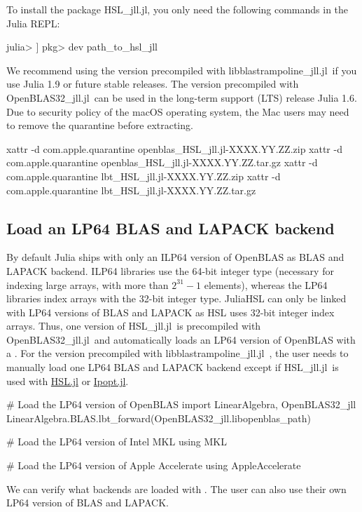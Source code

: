 \documentclass[gdweb]{geradwp}
\newcommand{\HSLjll}{HSL\_jll.jl}
\newcommand{\LBTjll}{libblastrampoline\_jll.jl}
\newcommand{\OpenBLASjll}{OpenBLAS32\_jll.jl}
\begin{document}
To install the package \HSLjll, you only need the following commands in the Julia REPL:
\begin{jllisting}
julia> ]
pkg> dev path_to_hsl_jll
\end{jllisting}
We recommend using the version precompiled with \LBTjll~if you use Julia 1.9 or future stable releases.
The version precompiled with \OpenBLASjll~can be used in the long-term support (LTS) release Julia 1.6.
Due to security policy of the macOS operating system, the Mac users may need to remove the quarantine before extracting.
\begin{jllisting}
xattr -d com.apple.quarantine openblas_HSL_jll.jl-XXXX.YY.ZZ.zip
xattr -d com.apple.quarantine openblas_HSL_jll.jl-XXXX.YY.ZZ.tar.gz
xattr -d com.apple.quarantine lbt_HSL_jll.jl-XXXX.YY.ZZ.zip
xattr -d com.apple.quarantine lbt_HSL_jll.jl-XXXX.YY.ZZ.tar.gz
\end{jllisting}

\subsection{Load an LP64 BLAS and LAPACK backend}

By default Julia ships with only an ILP64 version of OpenBLAS as BLAS and LAPACK backend.
ILP64 libraries use the 64-bit integer type (necessary for indexing large arrays, with more than $2^{31}-1$ elements), whereas the LP64 libraries index arrays with the 32-bit integer type.
JuliaHSL can only be linked with LP64 versions of BLAS and LAPACK as HSL uses 32-bit integer index arrays.
Thus, one version of \HSLjll~is precompiled with \OpenBLASjll~and automatically loads an LP64 version of OpenBLAS with a .
For the version precompiled with \LBTjll~, the user needs to manually load one LP64 BLAS and LAPACK backend except if \HSLjll~is used with \href{https://github.com/JuliaSmoothOptimizers/HSL.jl}{HSL.jl} or \href{https://github.com/jump-dev/Ipopt.jl}{Ipopt.jl}.
\begin{jllisting}
# Load the LP64 version of OpenBLAS
import LinearAlgebra, OpenBLAS32_jll
LinearAlgebra.BLAS.lbt_forward(OpenBLAS32_jll.libopenblas_path)

# Load the LP64 version of Intel MKL
using MKL

# Load the LP64 version of Apple Accelerate
using AppleAccelerate
\end{jllisting}
We can verify what backends are loaded with .
The user can also use their own LP64 version of BLAS and LAPACK.
\end{document}
